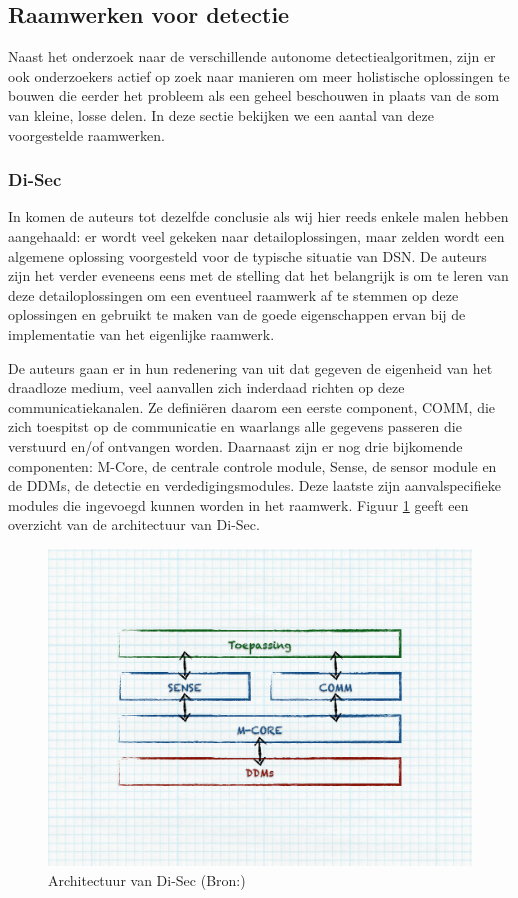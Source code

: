 
\subsection{Raamwerken voor detectie}
\label{subsection:frameworks}

Naast het onderzoek naar de verschillende autonome detectiealgoritmen, zijn er
ook onderzoekers actief op zoek naar manieren om meer holistische oplossingen
te bouwen die eerder het probleem als een geheel beschouwen in plaats van de
som van kleine, losse delen. In deze sectie bekijken we een aantal van deze
voorgestelde raamwerken.

\subsubsection*{Di-Sec}
\label{subsubsection:di-sec}

In \citep{valero2012di} komen de auteurs tot dezelfde conclusie als wij hier
reeds enkele malen hebben aangehaald: er wordt veel gekeken naar
detailoplossingen, maar zelden wordt een algemene oplossing voorgesteld voor de
typische situatie van DSN. De auteurs zijn het verder eveneens eens met de
stelling dat het belangrijk is om te leren van deze detailoplossingen om een
eventueel raamwerk af te stemmen op deze oplossingen en gebruikt te maken van
de goede eigenschappen ervan bij de implementatie van het eigenlijke raamwerk.

De auteurs gaan er in hun redenering van uit dat gegeven de eigenheid van het
draadloze medium, veel aanvallen zich inderdaad richten op deze
communicatiekanalen. Ze defini\"eren daarom een eerste component, COMM, die
zich toespitst op de communicatie en waarlangs alle gegevens passeren die
verstuurd en/of ontvangen worden. Daarnaast zijn er nog drie bijkomende
componenten: M-Core, de centrale controle module, Sense, de sensor module en de
DDMs, de detectie en verdedigingsmodules. Deze laatste zijn aanvalspecifieke
modules die ingevoegd kunnen worden in het raamwerk. Figuur
\ref{fig:di-sec-architecture} geeft een overzicht van de architectuur van
Di-Sec.

\begin{figure}[ht]
  \centering
  \includegraphics[width=0.8\linewidth]{resources/di-sec-architecture.pdf}
  \caption[Architectuur van Di-Sec]{Architectuur van Di-Sec (Bron:\citep{valero2012di})}
  \label{fig:di-sec-architecture}
\end{figure}

